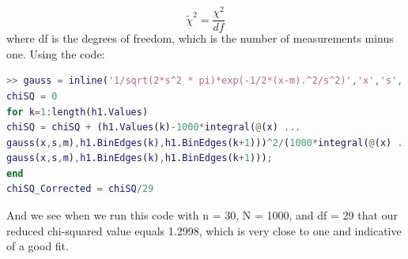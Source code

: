 \documentclass{article}
\begin{document}
\begin{enumerate}
        \begin{equation}
            \tilde{\chi}^2 = \frac{\chi^2}{df}
        \end{equation}
        where df is the degrees of freedom, which is the number of measurements minus one.
        Using the code:
        \begin{lstlisting}[language=Matlab, caption=Matlab code]
>> gauss = inline('1/sqrt(2*s^2 * pi)*exp(-1/2*(x-m).^2/s^2)','x','s','m')
chiSQ = 0
for k=1:length(h1.Values)
chiSQ = chiSQ + (h1.Values(k)-1000*integral(@(x) ...
gauss(x,s,m),h1.BinEdges(k),h1.BinEdges(k+1)))^2/(1000*integral(@(x) ...
gauss(x,s,m),h1.BinEdges(k),h1.BinEdges(k+1)));
end
chiSQ_Corrected = chiSQ/29
        \end{lstlisting}
        And we see when we run this code with n = 30, N = 1000, and df = 29 that our reduced chi-squared value equals 1.2998, which is very close to one and indicative of a good fit.
    \end{enumerate}
    
\end{document}
